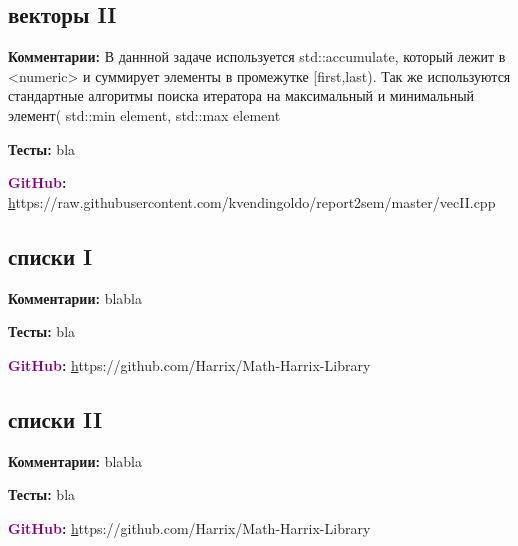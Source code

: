 \documentclass[a4paper,,titlepage]{report}
\newcommand{\gitlink}[1]{\textsf{\textbf {\textcolor{purple}{GitHub}:  }}\selectfont \href{}#1\par}
\newcommand{\comments}[1]{\textsf{\textbf {Комментарии:  }}#1\par}
\newcommand{\tests}[1]{\textsf{\textbf {Тесты:  }}#1\par}
\begin{document}
\begin{center}\section{векторы II}\end{center}
 
 \begin{flushleft}
\comments
	{
	В даннной задаче используется std::accumulate, который лежит в <numeric> и суммирует элементы в промежутке [first,last). Так же используются стандартные алгоритмы поиска итератора на максимальный и минимальный элемент( std::min element, std::max element	}
\tests{bla} 
\gitlink{https://raw.githubusercontent.com/kvendingoldo/report2sem/master/vecII.cpp}
\end{flushleft}


\begin{center}\section{списки I}\end{center}
 
 \begin{flushleft}
\comments{bla\newline bla}
\tests{bla} 
\gitlink{https://github.com/Harrix/Math-Harrix-Library}
\end{flushleft}
 

\begin{center}\section{списки II}\end{center}
 
 \begin{flushleft}
\comments{bla\newline bla}
\tests{bla} 
\gitlink{https://github.com/Harrix/Math-Harrix-Library}
\end{flushleft}
 
\end{document}
